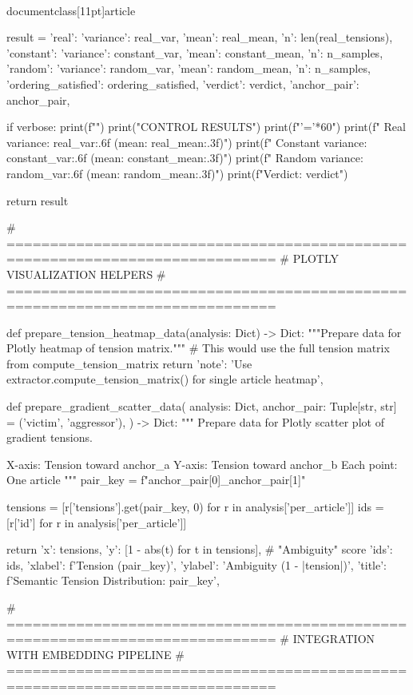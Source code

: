 \\documentclass[11pt]{article}
\begin{document}
\begin{CodeBlock}
    result = {
        'real': {'variance': real_var, 'mean': real_mean, 'n': len(real_tensions)},
        'constant': {'variance': constant_var, 'mean': constant_mean, 'n': n_samples},
        'random': {'variance': random_var, 'mean': random_mean, 'n': n_samples},
        'ordering_satisfied': ordering_satisfied,
        'verdict': verdict,
        'anchor_pair': anchor_pair,
    }
    
    if verbose:
        print(f"")
        print("CONTROL RESULTS")
        print(f"{'='*60}")
        print(f"  Real variance:     {real_var:.6f} (mean: {real_mean:.3f})")
        print(f"  Constant variance: {constant_var:.6f} (mean: {constant_mean:.3f})")
        print(f"  Random variance:   {random_var:.6f} (mean: {random_mean:.3f})")
        print(f"\n  Verdict: {verdict}")
    
    return result


# =============================================================================
# PLOTLY VISUALIZATION HELPERS
# =============================================================================

def prepare_tension_heatmap_data(analysis: Dict) -> Dict:
    """Prepare data for Plotly heatmap of tension matrix."""
    # This would use the full tension matrix from compute_tension_matrix
    return {
        'note': 'Use extractor.compute_tension_matrix() for single article heatmap',
    }


def prepare_gradient_scatter_data(
    analysis: Dict,
    anchor_pair: Tuple[str, str] = ('victim', 'aggressor'),
) -> Dict:
    """
    Prepare data for Plotly scatter plot of gradient tensions.
    
    X-axis: Tension toward anchor_a
    Y-axis: Tension toward anchor_b
    Each point: One article
    """
    pair_key = f"{anchor_pair[0]}_{anchor_pair[1]}"
    
    tensions = [r['tensions'].get(pair_key, 0) for r in analysis['per_article']]
    ids = [r['id'] for r in analysis['per_article']]
    
    return {
        'x': tensions,
        'y': [1 - abs(t) for t in tensions],  # "Ambiguity" score
        'ids': ids,
        'xlabel': f'Tension ({pair_key})',
        'ylabel': 'Ambiguity (1 - |tension|)',
        'title': f'Semantic Tension Distribution: {pair_key}',
    }


# =============================================================================
# INTEGRATION WITH EMBEDDING PIPELINE
# =============================================================================


\end{CodeBlock}
\end{document}
